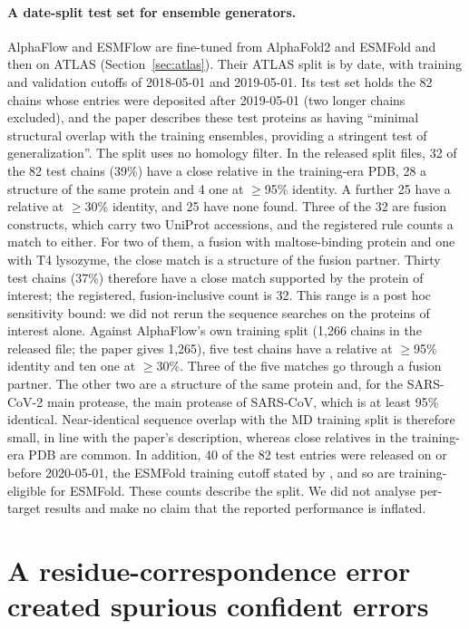 \documentclass{article}
\begin{document}
\paragraph{A date-split test set for ensemble generators.} AlphaFlow and
ESMFlow \citep{jing2024alphaflow} are fine-tuned from AlphaFold2 and ESMFold
and then on ATLAS (Section~\ref{sec:atlas}). Their ATLAS split is by date,
with training and validation cutoffs of 2018-05-01 and 2019-05-01. Its test
set holds the 82 chains whose entries were deposited after 2019-05-01 (two
longer chains excluded), and the paper describes these test proteins as
having ``minimal structural overlap with the training ensembles, providing a
stringent test of generalization''. The split uses no homology filter. In the
released split files, 32 of the 82 test chains (39\%) have a close relative
in the training-era PDB, 28 a structure of the same protein and 4 one at
$\ge$95\% identity. A further 25 have a relative at $\ge$30\% identity, and 25
have none found. Three of the 32 are fusion constructs, which carry two
UniProt accessions, and the registered rule counts a match to either. For
two of them, a fusion with maltose-binding protein and one with T4 lysozyme,
the close match is a structure of the fusion partner. Thirty test chains
(37\%) therefore have a close match supported by the protein of interest;
the registered, fusion-inclusive count is 32. This range is a post hoc
sensitivity bound: we did not rerun the sequence searches on the proteins of
interest alone. Against AlphaFlow's own training split (1{,}266 chains in the
released file; the paper gives 1{,}265), five test chains have a relative at
$\ge$95\% identity and ten one at $\ge$30\%. Three of the five matches go
through a fusion partner. The other two are a structure of the same protein
and, for the SARS-CoV-2 main protease, the main protease of SARS-CoV, which is
at least 95\% identical. Near-identical sequence overlap with the MD training
split is therefore small, in line with the paper's description, whereas close
relatives in the training-era PDB are common. In addition, 40 of the 82 test
entries were released on or before 2020-05-01, the ESMFold training cutoff
stated by \citet{jing2024alphaflow}, and so are training-eligible for
ESMFold. These counts describe the split. We did not analyse per-target
results and make no claim that the reported performance is inflated.

\section{A residue-correspondence error created spurious confident errors}
\label{sec:defect}
\end{document}

